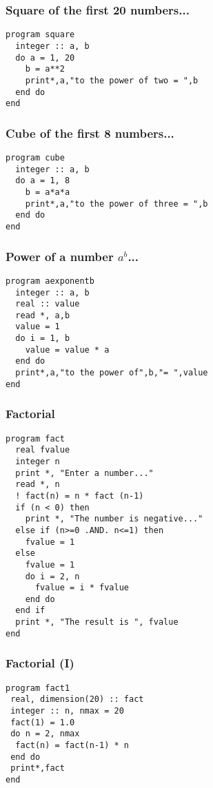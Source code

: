 \documentclass[xcolor=dvipsnames,dvip,notes=show,table]{beamer}
\begin{document}
\begin{frame}[fragile]
\frametitle{Square of the first 20 numbers...}

\scriptsize
\begin{lstlisting}
program square
  integer :: a, b
  do a = 1, 20
    b = a**2
    print*,a,"to the power of two = ",b
  end do
end
\end{lstlisting}
\end{frame}

\begin{frame}[fragile]
\frametitle{Cube of the first 8 numbers...}

\scriptsize
\begin{lstlisting}
program cube
  integer :: a, b
  do a = 1, 8
    b = a*a*a
    print*,a,"to the power of three = ",b
  end do
end
\end{lstlisting}
\end{frame}

\begin{frame}[fragile]
\frametitle{Power of a number $a^b$...}

\scriptsize
\begin{lstlisting}
program aexponentb
  integer :: a, b
  real :: value
  read *, a,b
  value = 1
  do i = 1, b
    value = value * a
  end do
  print*,a,"to the power of",b,"= ",value
end
\end{lstlisting}
\end{frame}



\begin{frame}[fragile]
\frametitle{Factorial}
\scriptsize
\begin{lstlisting}
program fact
  real fvalue
  integer n
  print *, "Enter a number..."
  read *, n
  ! fact(n) = n * fact (n-1)
  if (n < 0) then 
    print *, "The number is negative..."
  else if (n>=0 .AND. n<=1) then
    fvalue = 1
  else
    fvalue = 1
    do i = 2, n
      fvalue = i * fvalue
    end do
  end if
  print *, "The result is ", fvalue
end
\end{lstlisting}
\end{frame}



\begin{frame}[fragile]
\frametitle{Factorial (I)}

\scriptsize
\begin{lstlisting}
program fact1
 real, dimension(20) :: fact
 integer :: n, nmax = 20
 fact(1) = 1.0
 do n = 2, nmax
  fact(n) = fact(n-1) * n
 end do
 print*,fact
end
\end{lstlisting}
\end{frame}
\end{document}
